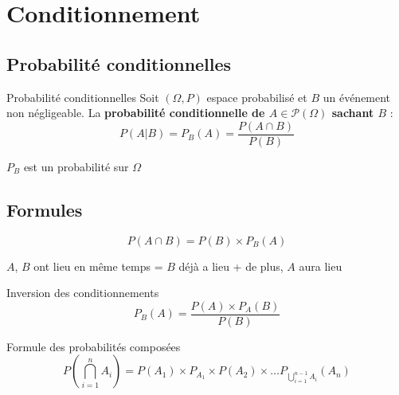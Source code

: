 \section{Conditionnement} %
\label{sec:Conditionnement}

\subsection{Probabilité conditionnelles} %

\begin{Definition}[colbacktitle=red!75!black]{Probabilité conditionnelles}{}
Soit $(\Omega, P)$ espace probabilisé et $B$ un événement non négligeable. La \textbf{probabilité conditionnelle de $A \in \mathscr{P}(\Omega)$ sachant $B$} : 
\begin{equation}
  P(A | B) = P_B(A) = \frac{
    P(A \cap B)
  }{P(B)} 
\end{equation}
\end{Definition}

\begin{Prop}{}{}
$P_B$ est un probabilité sur $\Omega$
\end{Prop}


\subsection{Formules} %
\label{sub:Formules}

\begin{Corollary}{}{}
\begin{equation}
  P(A \cap B) = P(B) \times P_B(A)
\end{equation}
\end{Corollary}
\begin{myproof}{}{}
$A$, $B$ ont lieu en même temps = $B$ déjà a lieu + de plus, $A$ aura lieu
\end{myproof}

\begin{Corollary}{
    Inversion des conditionnements
  }{}
\begin{equation}
  P_B(A) = \frac{P(A) \times P_A(B)}{P(B)} 
\end{equation}
\end{Corollary}
\begin{Prop}{Formule des probabilités composées}{}
\begin{equation}
  P \left( \bigcap _{i=1} ^{n} A_i \right)  = P(A_1) \times P _{A_1} \times P(A_2) \times \dots P _{\bigcup _{i=1} ^{n-1} A_i}(A_n)
\end{equation}
\end{Prop}

